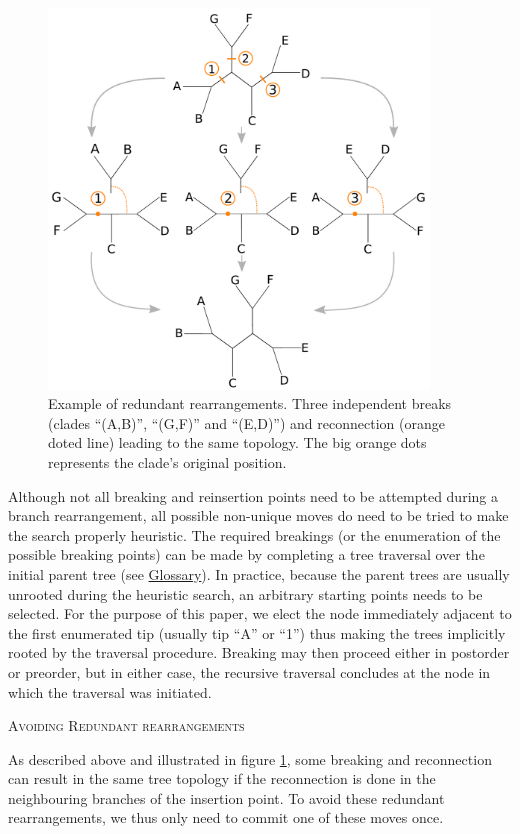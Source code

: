 \documentclass[12pt,letterpaper]{article}
\renewcommand{\section}[1]{%
\bigskip
\begin{center}
\begin{Large}
\normalfont\scshape #1
\medskip
\end{Large}
\end{center}}
\begin{document}
\begin{figure}[!htbp]
\centering
   \includegraphics[width=0.9\textwidth]{Figure/Figure_Redundantswaps.pdf}
\caption{Example of redundant rearrangements. Three independent breaks (clades ``(A,B)'', ``(G,F)'' and ``(E,D)'') and reconnection (orange doted line) leading to the same topology. The big orange dots represents the clade's original position.}
\label{Figure_redundant}
\end{figure}

Although not all breaking and reinsertion points need to be attempted during a branch rearrangement, all possible non-unique moves do need to be tried to make the search properly heuristic. 
The required breakings (or the enumeration of the possible breaking points) can be made by completing a tree traversal over the initial parent tree (see \hyperref[Glossary]{Glossary}).
In practice, because the parent trees are usually unrooted during the heuristic search, an arbitrary starting points needs to be selected.
For the purpose of this paper, we elect the node immediately adjacent to the first enumerated tip (usually tip ``A'' or ``1'') thus making the trees implicitly rooted by the traversal procedure.
Breaking may then proceed either in postorder or preorder, but in either case, the recursive traversal concludes at the node in which the traversal was initiated.

\section{Avoiding Redundant rearrangements}
As described above and illustrated in figure \ref{Figure_redundant}, some breaking and reconnection can result in the same tree topology if the reconnection is done in the neighbouring branches of the insertion point.
To avoid these redundant rearrangements, we thus only need to commit one of these moves once.
\end{document}
